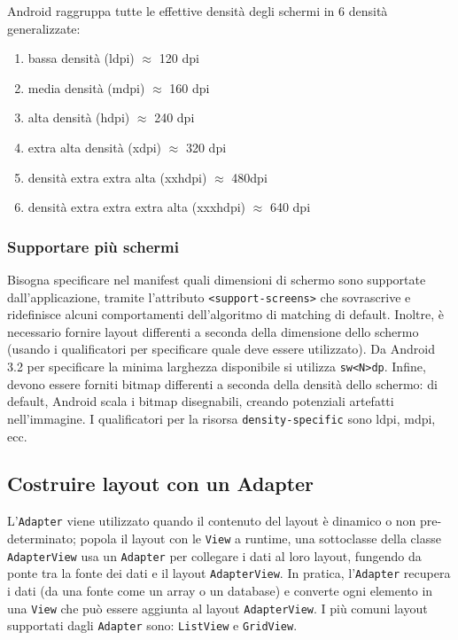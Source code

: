 Android raggruppa tutte le effettive densità degli schermi in 6 densità
generalizzate:

\begin{enumerate}
\item bassa densità (ldpi) $\approx$ 120 dpi
\item media densità (mdpi) $\approx$ 160 dpi
\item alta densità (hdpi) $\approx$ 240 dpi
\item extra alta densità (xdpi) $\approx$ 320 dpi
\item densità extra extra alta (xxhdpi) $\approx$ 480dpi
\item densità extra extra extra alta (xxxhdpi) $\approx$ 640 dpi
\end{enumerate}

\subsubsection{Supportare più schermi}

Bisogna specificare nel manifest quali dimensioni di schermo sono supportate
dall'applicazione, tramite l'attributo \texttt{<support-screens>} che
sovrascrive e ridefinisce alcuni comportamenti dell'algoritmo di matching di
default.
Inoltre, è necessario fornire layout differenti a seconda della dimensione dello
schermo (usando i qualificatori per specificare quale deve essere utilizzato).
Da Android 3.2 per specificare la minima larghezza disponibile si utilizza
\texttt{sw<N>dp}.
Infine, devono essere forniti bitmap differenti a seconda della densità dello
schermo: di default, Android scala i bitmap disegnabili, creando potenziali
artefatti nell'immagine. I qualificatori per la risorsa
\texttt{density-specific} sono ldpi, mdpi, ecc.

\subsection{Costruire layout con un Adapter}

L'\texttt{Adapter} viene utilizzato quando il contenuto del layout è dinamico o
non pre-determinato; popola il layout con le \texttt{View} a runtime, una
sottoclasse della classe \texttt{AdapterView} usa un \texttt{Adapter} per
collegare i dati al loro layout, fungendo da ponte tra la fonte dei dati e il
layout \texttt{AdapterView}. In pratica, l'\texttt{Adapter} recupera i dati (da
una fonte come un array o un database) e converte ogni elemento in una
\texttt{View} che può essere aggiunta al layout \texttt{AdapterView}.
I più comuni layout supportati dagli \texttt{Adapter} sono: \texttt{ListView} e
\texttt{GridView}.

